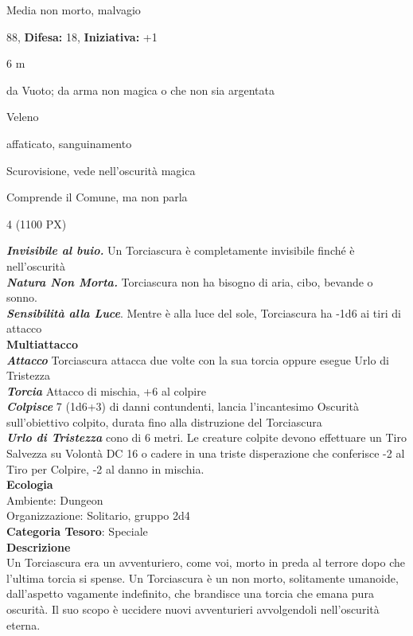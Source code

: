 \begin{multicols}{2}
{
\noindent
\begin{description}[noitemsep, topsep=0pt, parsep=0pt, partopsep=0pt, leftmargin=0cm, labelwidth=2.2cm]
	\item[\textbf{Taglia/Tipo:}] Media non morto, malvagio
	\item[\textbf{Caratt.:}] 
	\item[\textbf{Punti Ferita:}] 88,  \textbf{Difesa:} 18,  \textbf{Iniziativa:} +1
	\item[\textbf{Movimento:}] 6 m
	\item[\textbf{Tiri Salvez.:}] 
	\item[\textbf{Res. Danni:}] da Vuoto; da arma non magica o che non sia argentata
	\item[\textbf{Imm. Danni:}] Veleno
	\item[\textbf{Immunità:}] affaticato, sanguinamento
	\item[\textbf{Sensi:}] Scurovisione, vede nell'oscurità magica
	\item[\textbf{Linguaggi:}] Comprende il Comune, ma non parla
	\item[\textbf{Sfida:}] 4 (1100 PX)\smallskip
\end{description}

\emph{\textbf{Invisibile al buio.}} Un Torciascura è completamente invisibile finché è nell'oscurità\\
\emph{\textbf{Natura Non Morta.}} Torciascura non ha bisogno di aria, cibo, bevande o sonno.\\
\emph{\textbf{Sensibilità alla Luce}}. Mentre è alla luce del sole, Torciascura ha -1d6 ai tiri di attacco\\
\textbf{Multiattacco}\\
\emph{\textbf{Attacco}} Torciascura attacca due volte con la sua torcia oppure esegue Urlo di Tristezza\\
\emph{\textbf{Torcia}} Attacco di mischia, +6 al colpire\\
\emph{\textbf{Colpisce}} 7 (1d6+3) di danni contundenti, lancia l'incantesimo Oscurità sull'obiettivo colpito, durata fino alla distruzione del Torciascura\\
\emph{\textbf{Urlo di Tristezza}} cono di 6 metri. Le creature colpite devono effettuare un Tiro Salvezza su Volontà DC 16 o cadere in una triste disperazione che conferisce -2 al Tiro per Colpire, -2 al danno in mischia.\\
\textbf{Ecologia}\\
Ambiente: Dungeon\\
Organizzazione: Solitario, gruppo 2d4\\
\textbf{Categoria Tesoro}: Speciale\\
\textbf{Descrizione}\\
Un Torciascura era un avventuriero, come voi, morto in preda al terrore dopo che l'ultima torcia si spense. Un Torciascura è un non morto, solitamente umanoide, dall'aspetto vagamente indefinito, che brandisce una torcia che emana pura oscurità. Il suo scopo è uccidere nuovi avventurieri avvolgendoli nell'oscurità eterna.

}
\end{multicols}
